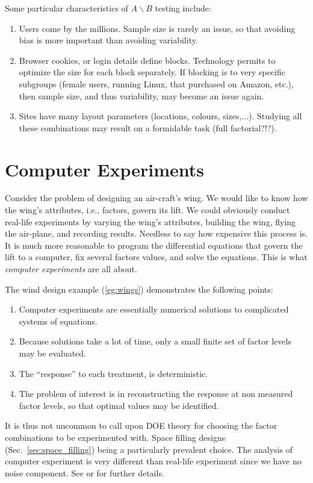 Some particular characteristics of $A\backslash B$ testing include:
\begin{enumerate}
\item Users come by the millions. Sample size is rarely an issue, so that avoiding bias is more important than avoiding variability.
\item Browser cookies, or login details define blocks. Technology permits to optimize the size for each block separately. If blocking is to very specific subgroups (female users, running Linux, that purchased on Amazon, etc.), then sample size, and thus variability, may become an issue again.
\item Sites have many layout parameters (locations, colours, sizes,...). Studying all these combinations may result on a formidable task (full factorial?!?).
\end{enumerate}




\section{Computer Experiments}
\begin{example}
\label{eg:wings}
Consider the problem of designing an air-craft's wing.
We would like to know how the wing's attributes, i.e., factors, govern its lift.
We could obviously conduct real-life experiments by varying the wing's attributes, building the wing, flying the air-plane, and recording results. 
Needless to say how expensive this process is.
It is much more reasonable to program the differential equations that govern the lift to a computer, fix several factors values, and solve the equations.
This is what \emph{computer experiments} are all about. 
\end{example}


The wind design example (\ref{eg:wings}) demonstrates the following points:
\begin{enumerate}
\item Computer experiments are essentially numerical solutions to complicated systems of equations.
\item Because solutions take a lot of time, only a small finite set of factor levels may be evaluated. 
\item The ``response'' to each treatment, is deterministic. 
\item The problem of interest is in reconstructing the response at non measured factor levels, so that optimal values may be identified. 
\end{enumerate}
It is thus not uncommon to call upon DOE theory for choosing the factor combinations to be experimented with. Space filling designs (Sec.~\ref{sec:space_filling}) being a particularly prevalent choice. 
The analysis of computer experiment is very different than real-life experiment since we have no noise component. 
See \cite{sacks_design_1989} or \cite{santner_design_2013} for further details. 



